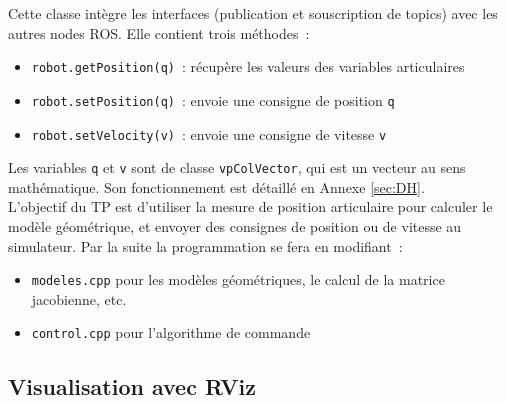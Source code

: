 \documentclass[12pt,a4paper]{article}
\def\vpV{\texttt{vpColVector}}
\begin{document}
Cette classe intègre les interfaces (publication et souscription de topics) avec les autres nodes ROS. Elle contient trois méthodes~:
\begin{itemize}
\item \texttt{robot.getPosition(q)}~: récupère les valeurs des variables articulaires
\item \texttt{robot.setPosition(q)}~: envoie une consigne de position \texttt{q}
\item \texttt{robot.setVelocity(v)}~: envoie une consigne de vitesse \texttt{v}
\end{itemize}
Les variables \texttt{q} et \texttt{v} sont de classe \vpV, qui est un vecteur au sens mathématique. Son fonctionnement est détaillé en Annexe \ref{sec:DH}. \\

L'objectif du TP est d'utiliser la mesure de position articulaire pour calculer le modèle géométrique, et envoyer des consignes de position ou de vitesse au simulateur. Par la suite la programmation se fera en modifiant~:
\begin{itemize}
\item \texttt{modeles.cpp} pour les modèles géométriques, le calcul de la matrice jacobienne, etc.
\item \texttt{control.cpp} pour l'algorithme de commande
\end{itemize}


\subsection{Visualisation avec RViz} 
\end{document}
